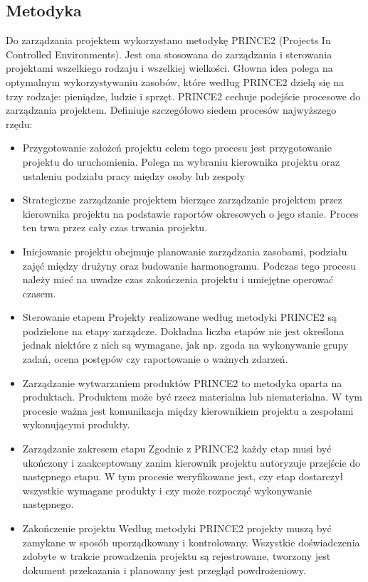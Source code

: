 \documentclass[11pt,a4paper]{article}
\begin{document}
  \subsection{Metodyka}
  Do zarządzania projektem wykorzystano metodykę PRINCE2 (Projects In Controlled Environments). 
  Jest ona stosowana do zarządzania i sterowania projektami wszelkiego rodzaju i wszelkiej wielkości. 
  Głowna idea polega na optymalnym wykorzystywaniu zasobów, które według PRINCE2 dzielą się na trzy rodzaje: pieniądze, ludzie i sprzęt. PRINCE2 cechuje podejście procesowe do zarządzania projektem. Definiuje szczegółowo siedem procesów najwyższego rzędu: 
  \begin{itemize}
    \item Przygotowanie założeń projektu celem tego procesu jest przygotowanie projektu do uruchomienia.
    Polega na wybraniu kierownika projektu oraz ustaleniu podziału pracy między osoby lub zespoły 
    \item Strategiczne zarządzanie projektem bierzące zarządzanie projektem przez kierownika projektu na podstawie raportów okresowych o jego stanie. Proces ten trwa przez cały czas trwania projektu. 
    \item Inicjowanie projektu obejmuje planowanie zarządzania zasobami, podziału zajęć między drużyny oraz budowanie harmonogramu.
    Podczas tego procesu należy mieć na uwadze czas zakończenia projektu i umiejętne operować czasem.  
    \item Sterowanie etapem Projekty realizowane według metodyki PRINCE2 są podzielone na etapy zarządcze. 
    Dokładna liczba etapów nie jest określona jednak niektóre z nich są wymagane, jak np. zgoda na wykonywanie grupy zadań, ocena postępów czy raportowanie o ważnych zdarzeń. 
    \item Zarządzanie wytwarzaniem produktów PRINCE2 to metodyka oparta na produktach. 
    Produktem może być rzecz materialna lub niematerialna. W tym procesie ważna jest komunikacja między kierownikiem projektu a zespołami wykonującymi produkty. 
    \item Zarządzanie zakresem etapu Zgodnie z PRINCE2 każdy etap musi być ukończony i zaakceptowany zanim kierownik projektu autoryzuje przejście do następnego etapu. W tym procesie weryfikowane jest, czy etap dostarczył wszystkie wymagane produkty i czy może rozpocząć wykonywanie następnego. 
    \item Zakończenie projektu Według metodyki PRINCE2 projekty muszą być zamykane w sposób uporządkowany i kontrolowany. 
    Wszystkie doświadczenia zdobyte w trakcie prowadzenia projektu są rejestrowane, tworzony jest dokument przekazania i planowany jest przegląd powdrożeniowy.  
 \end{itemize}
\end{document}

